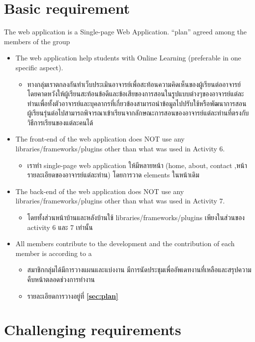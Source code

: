 \documentclass[17pt]{extarticle}
\begin{document}
\section{Basic requirement}
The web application is a Single-page Web Application.
“plan” agreed among the members of the group
\begin{itemize}
    \item The web application help students with Online Learning (preferable in one specific aspect).
    \begin{itemize}
        \item ทางกลุ่มเราตกลงกันทำเว็บประเมินอาจารย์เพื่อสะท้อนความคิดเห็นของผู้เรียนต่ออาจารย์ โดยคาดหวังให้ผู้เรียนสะท้อนข้อดีและข้อเสียของการสอนในรูปแบบต่างๆของอาจารย์แต่ละท่านเพื่อทั้งตัวอาจารย์และบุคลากรที่เกี่ยวข้องสามารถนำข้อมูลไปปรับใช้หรือพัฒนาการสอน ผู้เรียนรุ่นต่อไปสามารถพิจารณาเข้าเรียนจากลักษณะการสอนของอาจารย์แต่ละท่านที่ตรงกับวิธีการเรียนของแต่ละคนได้ 
    \end{itemize}
    \item The front-end of the web application does NOT use any libraries/frameworks/plugins other than what was used in Activity 6. 
    \begin{itemize}
        \item เราทำ single-page web application ให้มีหลายหน้า (home, about, contact ,หน้ารายละเอียดของอาจารย์แต่ละท่าน) โดยการวาด elements ในหน้าเดิม 
    \end{itemize}
    \item The back-end of the web application does NOT use any libraries/frameworks/plugins other than what was used in Activity 7.
    \begin{itemize}
        \item โดยทั้งส่วนหน้าบ้านและหลังบ้านใช้ libraries/frameworks/plugins เพียงในส่วนของ activity 6 และ 7 เท่านั้น 
    \end{itemize}
    \item All members contribute to the development and the contribution of each member is according to a
    \begin{itemize}
        \item สมาชิกกลุ่มได้มีการวางแผนและแบ่งงาน มีการนัดประชุมเพื่ออัพเดทงานที่เหลือและสรุปความคืบหน้าตลอดช่วงการทำงาน
        \item รายละเอียดการวางอยู่ที่ \textbf{\autoref{sec:plan}}
    \end{itemize}
\end{itemize}
\section{Challenging requirements}
\end{document}
